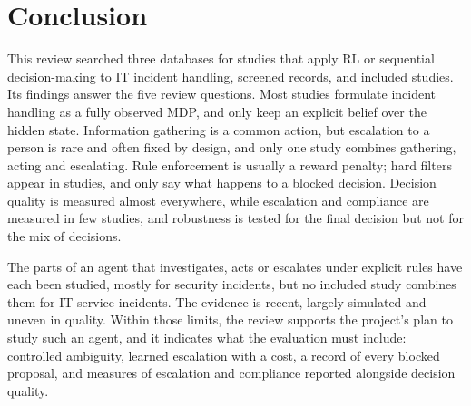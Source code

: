\section{Conclusion}
\label{sec:conclusion}

This review searched three databases for studies that apply RL or sequential decision-making to IT incident handling, screened \NScreened{} records, and included \NIncluded{} studies. Its findings answer the five review questions. Most studies formulate incident handling as a fully observed MDP, and only \NBelief{} keep an explicit belief over the hidden state. Information gathering is a common action, but escalation to a person is rare and often fixed by design, and only one study combines gathering, acting and escalating. Rule enforcement is usually a reward penalty; hard filters appear in \NShield{} studies, and only \NBlocked{} say what happens to a blocked decision. Decision quality is measured almost everywhere, while escalation and compliance are measured in few studies, and robustness is tested for the final decision but not for the mix of decisions.

The parts of an agent that investigates, acts or escalates under explicit rules have each been studied, mostly for security incidents, but no included study combines them for IT service incidents. The evidence is recent, largely simulated and uneven in quality. Within those limits, the review supports the project's plan to study such an agent, and it indicates what the evaluation must include: controlled ambiguity, learned escalation with a cost, a record of every blocked proposal, and measures of escalation and compliance reported alongside decision quality.
